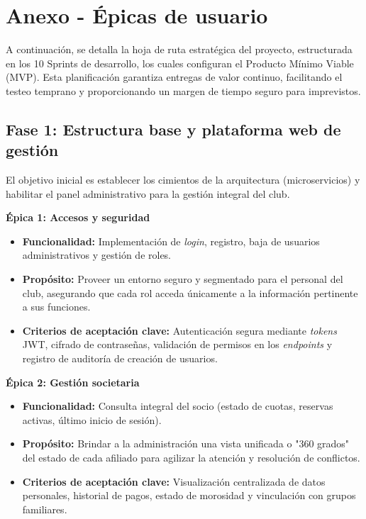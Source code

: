 \section{Anexo - Épicas de usuario}

A continuación, se detalla la hoja de ruta estratégica del proyecto, estructurada en los 10 Sprints de desarrollo, los cuales configuran el Producto Mínimo Viable (MVP). Esta planificación garantiza entregas de valor continuo, facilitando el testeo temprano y proporcionando un margen de tiempo seguro para imprevistos.

\subsection{Fase 1: Estructura base y plataforma web de gestión}

El objetivo inicial es establecer los cimientos de la arquitectura (microservicios) y habilitar el panel administrativo para la gestión integral del club.

\textbf{Épica 1: Accesos y seguridad}
\begin{itemize}
    \item \textbf{Funcionalidad:} Implementación de \textit{login}, registro, baja de usuarios administrativos y gestión de roles.
    \item \textbf{Propósito:} Proveer un entorno seguro y segmentado para el personal del club, asegurando que cada rol acceda únicamente a la información pertinente a sus funciones.
    \item \textbf{Criterios de aceptación clave:} Autenticación segura mediante \textit{tokens} JWT, cifrado de contraseñas, validación de permisos en los \textit{endpoints} y registro de auditoría de creación de usuarios.
\end{itemize}

\textbf{Épica 2: Gestión societaria}
\begin{itemize}
    \item \textbf{Funcionalidad:} Consulta integral del socio (estado de cuotas, reservas activas, último inicio de sesión).
    \item \textbf{Propósito:} Brindar a la administración una vista unificada o "360 grados" del estado de cada afiliado para agilizar la atención y resolución de conflictos.
    \item \textbf{Criterios de aceptación clave:} Visualización centralizada de datos personales, historial de pagos, estado de morosidad y vinculación con grupos familiares.
\end{itemize}

